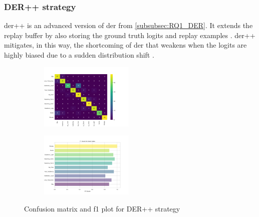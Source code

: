 \subsubsection{DER++ strategy}
\label{subsubsec:RQ1_DER++}
\acrfull{der++} is an advanced version of \acrshort{der} from \ref{subsubsec:RQ1_DER}. It extends the replay buffer by also storing the ground truth logits and replay examples \citep{buzzega2020dark}. \acrshort{der++} mitigates, in this way, the shortcoming of \acrshort{der} that weakens when the logits are highly biased due to a sudden distribution shift \citep{ling2022difficulty}. 

\begin{figure}[H]
\centering
\begin{subfigure}
  \centering
  \includegraphics[width=0.49\textwidth]{Images/cm_DER++_MultiView_100epochs.png}  
  \label{fig:sub-first6}
\end{subfigure}
\begin{subfigure}
  \centering
  \includegraphics[width=0.49\textwidth]{Images/f1_DER++_MultiView_100epochs.png}  
  \label{fig:sub-second6}
\end{subfigure}
\caption{Confusion matrix and f1 plot for DER++ strategy}
\label{fig:cm_f1_der++_baseline}
\end{figure}
